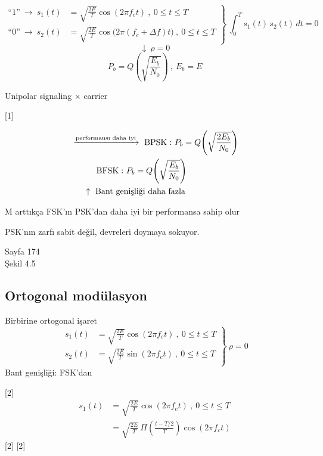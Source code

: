 \documentclass[11pt,a4paper]{article}
\begin{document}
\[ \left.\begin{aligned}
\text{``1''}\ \rightarrow\ s_1(t)&=\sqrt{\tfrac{2E}{T}}\cos(2\pi f_ct)\ ,\ 0\le t\le T\\
\text{``0''}\ \rightarrow\ s_2(t)&=\sqrt{\tfrac{2E}{T}}\cos\bigl(2\pi(f_c+\Delta f)t\bigr)\ ,\ 0\le t\le T
\end{aligned}\right\}\ \int_0^T s_1(t)\,s_2(t)\,dt=0 \]
\[ \downarrow\ \rho=0 \]
\[ P_b=Q\!\left(\sqrt{\frac{E_b}{N_0}}\right)\ ,\ E_b=E \]

Unipolar signaling $\times$ carrier

[1]

\[
\begin{aligned}
&\xrightarrow{\text{performansı daha iyi}}\ \mathrm{BPSK:}\ P_b=Q\!\left(\sqrt{\frac{2E_b}{N_0}}\right)\\
&\hspace{3em}\mathrm{BFSK:}\ P_b=Q\!\left(\sqrt{\frac{E_b}{N_0}}\right)\\
&\hspace{1.5em}\uparrow\ \text{Bant genişliği daha fazla}
\end{aligned}
\]

M arttıkça FSK'ın PSK'dan daha iyi bir performansa sahip olur

PSK'nın zarfı sabit değil, devreleri doymaya sokuyor.
\begin{flushright}
Sayfa 174\\
Şekil 4.5
\end{flushright}

\subsection{Ortogonal modülasyon}
Birbirine ortogonal işaret
\[ \left.\begin{aligned}
s_1(t)&=\sqrt{\tfrac{2E}{T}}\cos(2\pi f_ct)\ ,\ 0\le t\le T\\
s_2(t)&=\sqrt{\tfrac{2E}{T}}\sin(2\pi f_ct)\ ,\ 0\le t\le T
\end{aligned}\right\}\ \rho=0 \]
Bant genişliği: FSK'dan 

[2]
\begin{align*}
s_1(t)&=\sqrt{\tfrac{2E}{T}}\cos(2\pi f_ct)\ ,\ 0\le t\le T\\
&=\sqrt{\tfrac{2E}{T}}\,\Pi\!\left(\frac{t-T/2}{T}\right)\cos(2\pi f_ct)
\end{align*}
[2]
[2]
\end{document}
